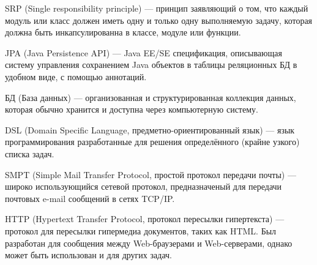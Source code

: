 \hypertarget{gloss:srp}{
    SRP (Single responsibility principle) --- принцип заявляющий о том, что каждый модуль или класс должен иметь одну и только одну выполняемую задачу, которая должна быть инкапсулированна в классе, модуле или функции.
}

\hypertarget{gloss:jpa}{
    JPA (Java Persistence API) --- Java EE/SE спецификация, описывающая систему управления сохранением Java объектов в таблицы реляционных БД в удобном виде, с помощью аннотаций.
}

\hypertarget{gloss:db}{
    БД (База данных) --- организованная и структурированная коллекция данных, которая обычно хранится и доступна через компьютерную систему.
}

\hypertarget{gloss:dsl}{
    DSL (Domain Specific Language, предметно-ориентированный язык) --- язык программирования разработанные для решения определённого (крайне узкого) списка задач. 
}

\hypertarget{gloss:smtp}{
    SMPT (Simple Mail Transfer Protocol, простой протокол передачи почты) --- широко использующийся сетевой протокол, предназначеный для передачи почтовых e-mail сообщений в сетях TCP/IP. 
}

\hypertarget{gloss:http}{
    HTTP (Hypertext Transfer Protocol, протокол пересылки гипертекста) --- протокол для пересылки гипермедиа документов, таких как HTML.
    Был разработан для сообщения между Web-браузерами и Web-серверами, однако может быть использован и для других задач.
}

\clearpage